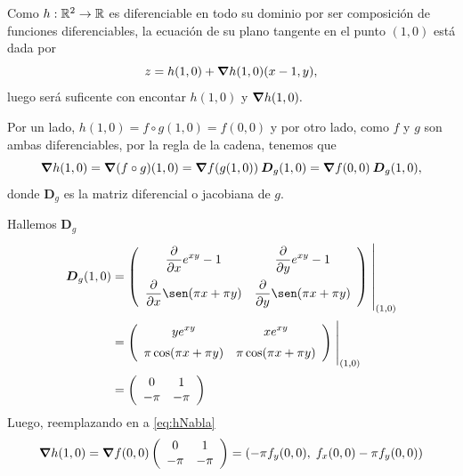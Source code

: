 \begin{solution}

    Como   $h:\mathbb{R}^2\to\mathbb{R}$ es diferenciable en todo su dominio por ser composición de funciones diferenciables,  la ecuaci\'on de su plano tangente en el punto $(1,0)$ est\'a dada por
    \begin{equation}
        z= h(1,0) + \grad h(1,0) (x-1,y),  \label{eq:zNabla4}
    \end{equation}   luego ser\'a  suficente con encontar $ h(1,0)$ y $\grad h(1,0).$

    Por un lado,      $h(1,0)= f\circ g (1,0) =  f(0,0)$  y por otro lado,  como $f$ y $g$ son ambas diferenciables,  por la regla de la cadena,  tenemos que
    \begin{equation}
        \grad h(1,0)=\grad (f\circ g)(1,0)=\grad f(g(1,0)) \:\boldsymbol{D}_g(1,0) = \grad f (0,0) \:\boldsymbol{D}_g(1,0),  \label{eq:hNabla5}
    \end{equation}    donde $\boldsymbol{D}_g$ es la matriz diferencial o  jacobiana de $g$.

    \noindent  Hallemos $\boldsymbol{D}_g$
    \begin{align*}
        \boldsymbol{D}_g(1,0) & =
        \left(\begin{array}{cc}
                      \displaystyle\partialx e^{xy}-1            & \displaystyle\partialy e^{xy}-1           \\[10pt]
                      \displaystyle\partialx  \sen (\pi x+\pi y) & \displaystyle\partialy \sen (\pi x+\pi y)
                  \end{array}\right)\left.\rule{0pt}{1.1cm}\right\rvert_{(1,0)}             \\[2pt]
                              & =\left(\begin{array}{cc}
                                               \displaystyle ye^{xy}                 & \displaystyle xe^{xy}              \\[5pt]
                                               \displaystyle   \pi\cos (\pi x+\pi y) & \displaystyle \pi\cos(\pi x+\pi y)
                                           \end{array}\right)\left.\rule{0pt}{0.7cm}\right\rvert_{(1,0)} \\[2pt]
                              & =\left(\begin{array}{cc}
                                               0    & 1    \\
                                               -\pi & -\pi
                                           \end{array}\right)
    \end{align*}
    Luego, reemplazando en  a   \eqref{eq:hNabla}
    \[
        \grad h(1,0) = \grad f(0,0)\left(\begin{array}{cc}
                0    & 1    \\
                -\pi & -\pi
            \end{array}\right) = \left(-\pi f_y(0,0),\;f_x(0,0)-\pi f_y(0,0)\right)
    \]


\end{solution}
